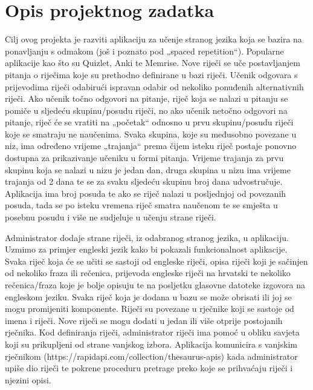 \chapter{Opis projektnog zadatka}
		
Cilj ovog projekta je razviti aplikaciju za učenje stranog jezika koja se bazira na ponavljanju s odmakom (još i poznato pod „spaced repetition“). Popularne aplikacije kao što su Quizlet, Anki te Memrise. Nove riječi se uče postavljanjem pitanja o riječima koje su prethodno definirane u bazi riječi. Učenik odgovara s prijevodima riječi odabirući ispravan odabir od nekoliko ponuđenih alternativnih riječi. Ako učenik točno odgovori na pitanje, riječ koja se nalazi u pitanju se pomiče u sljedeću skupinu/posudu riječi, no ako učenik netočno odgovori na pitanje, riječ će se vratiti na „početak“ odnosno u prvu skupinu/posudu riječi koje se smatraju ne naučenima. Svaka skupina, koje su međusobno povezane u niz, ima određeno vrijeme „trajanja“ prema čijem isteku riječ postaje ponovno dostupna za prikazivanje učeniku u formi pitanja. Vrijeme trajanja za prvu skupinu koja se nalazi u nizu je jedan dan, druga skupina u nizu ima vrijeme trajanja od 2 dana te se za svaku sljedeću skupinu broj dana udvostručuje. Aplikacija ima        broj posuda te ako se riječ nalazi u posljednjoj od povezanih posuda, tada se po isteku vremena riječ smatra naučenom te se smješta u posebnu posudu i više ne sudjeluje u učenju strane riječi. 

Administrator dodaje strane riječi, iz odabranog stranog jezika, u aplikaciju. Uzmimo za primjer engleski jezik kako bi pokazali funkcionalnost aplikacije. Svaka riječ koja će se učiti se sastoji od engleske riječi, opisa riječi koji je sačinjen od nekoliko fraza ili rečenica, prijevoda engleske riječi na hrvatski te nekoliko rečenica/fraza koje je bolje opisuju te na posljetku glasovne datoteke izgovora na engleskom jeziku. Svaka riječ koja je dodana u bazu se može obrisati ili joj se mogu promijeniti komponente. Riječi su povezane u rječnike koji se sastoje od imena i riječi. Nove riječi se mogu dodati u jedan ili više otprije postojanih rječnika. Kod definiranja riječi, administrator riječi ima pomoć u obliku savjeta koji su prikupljeni od strane vanjskog izbora. Aplikacija komunicira s vanjskim rječnikom 
(https://rapidapi.com/collection/thesaurus-apis) kada administrator upiše dio riječi te pokrene proceduru pretrage preko koje se prihvaćaju riječi i njezini opisi. 

